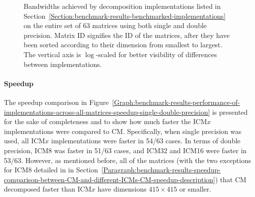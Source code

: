 \begin{figure}[ht!]
\begin{subfigure}{\textwidth}
		\label{Graph:benchmark-results-performance-of-implementations-across-all-matrices-bandwidth-double-precision}
	\end{subfigure}
	\caption{Bandwidths achieved by decomposition implementations listed in Section~\ref{Section:benchmark-results-benchmarked-implementations} on the entire set of 63 matrices using both single and double precision. Matrix ID signifies the ID of the matrices, after they have been sorted according to their dimension from smallest to largest. The vertical axis is $ \log $-scaled for better visibility of differences between implementations.}
	\label{Graph:benchmark-results-performance-of-implementations-across-all-matrices-bandwidth-single-double-precision}
\end{figure}

\paragraph{Speedup} The speedup comparison in Figure~\ref{Graph:benchmark-results-performance-of-implementations-across-all-matrices-speedup-single-double-precision} is presented for the sake of completeness and to show how much faster the ICM$ x $ implementations were compared to CM. Specifically, when single precision was used, all ICM$ x $ implementations were faster in 54/63 cases. In terms of double precision, ICM8 was faster in 51/63 cases, and ICM32 and ICM16 were faster in 53/63. However, as mentioned before, all of the matrices (with the two exceptions for ICM8 detailed in \textit{} in Section~\ref{Paragraph:benchmark-results-speedup-comparison-between-CM-and-different-ICMs-CM-speedup-description}) that CM decomposed faster than ICM$ x $ have dimensions $ 415\times 415 $ or smaller.

